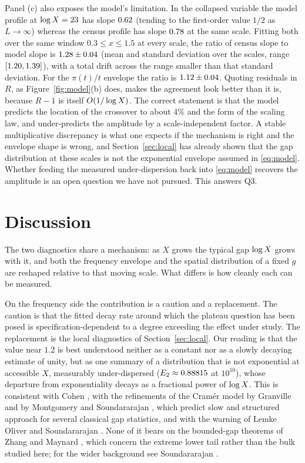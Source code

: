 \documentclass[11pt,a4paper]{article}
\begin{document}
Panel (c) also exposes the model's limitation. In the collapsed variable the model profile at $\log X=23$ has slope $0.62$ (tending to the first-order value $1/2$ as $L\to\infty$) whereas the census profile has slope $0.78$ at the same scale. Fitting both over the same window $0.3\le x\le1.5$ at every scale, the ratio of census slope to model slope is $1.28\pm0.04$ (mean and standard deviation over the \nScales{} scales, range $[1.20,1.39]$), with a total drift across the range smaller than that standard deviation. For the $\pi(t)/t$ envelope the ratio is $1.12\pm0.04$. Quoting residuals in $R$, as Figure~\ref{fig:model}(b) does, makes the agreement look better than it is, because $R-1$ is itself $O(1/\log X)$. The correct statement is that the model predicts the location of the crossover to about $4\%$ and the form of the scaling law, and under-predicts the amplitude by a scale-independent factor. A stable multiplicative discrepancy is what one expects if the mechanism is right and the envelope shape is wrong, and Section~\ref{sec:local} has already shown that the gap distribution at these scales is not the exponential envelope assumed in \eqref{eq:model}. Whether feeding the measured under-dispersion back into \eqref{eq:model} recovers the amplitude is an open question we have not pursued. This answers Q3.

\section{Discussion}

The two diagnostics share a mechanism: as $X$ grows the typical gap $\log X$ grows with it, and both the frequency envelope and the spatial distribution of a fixed $g$ are reshaped relative to that moving scale. What differs is how cleanly each can be measured.

On the frequency side the contribution is a caution and a replacement. The caution is that the fitted decay rate around which the plateau question has been posed \cite{Brent1974,OdlyzkoRubinsteinWolf1999,Wolf2014} is specification-dependent to a degree exceeding the effect under study. The replacement is the local diagnostics of Section~\ref{sec:local}. Our reading is that the value near $1.2$ is best understood neither as a constant nor as a slowly decaying estimate of unity, but as one summary of a distribution that is not exponential at accessible $X$, measurably under-dispersed ($E_2\approx0.88815$ at $10^{10}$), whose departure from exponentiality decays as a fractional power of $\log X$. This is consistent with Cohen \cite{Cohen2025}, with the refinements of the Cram\'er model \cite{Cramer1936} by Granville \cite{Granville1995} and by Montgomery and Soundararajan \cite{MontgomerySoundararajan2002,MontgomerySoundararajan2004}, which predict slow and structured approach for several classical gap statistics, and with the warning of Lemke Oliver and Soundararajan \cite{LemkeOliverSoundararajan2016}. None of it bears on the bounded-gap theorems of Zhang \cite{Zhang2014} and Maynard \cite{Maynard2015}, which concern the extreme lower tail rather than the bulk studied here; for the wider background see Soundararajan \cite{Soundararajan2007}.
\end{document}
